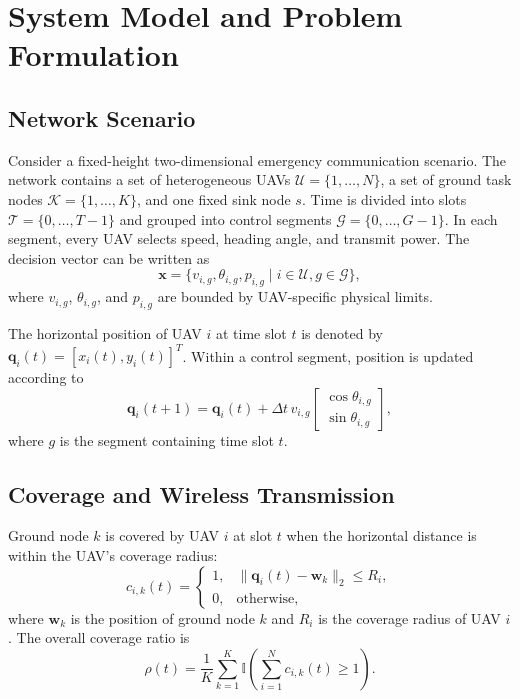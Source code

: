 \documentclass[lettersize,journal]{IEEEtran}
\begin{document}
\section{System Model and Problem Formulation}
\subsection{Network Scenario}
Consider a fixed-height two-dimensional emergency communication scenario. The network contains a set of heterogeneous UAVs $\mathcal{U}=\{1,\ldots,N\}$, a set of ground task nodes $\mathcal{K}=\{1,\ldots,K\}$, and one fixed sink node $s$. Time is divided into slots $\mathcal{T}=\{0,\ldots,T-1\}$ and grouped into control segments $\mathcal{G}=\{0,\ldots,G-1\}$. In each segment, every UAV selects speed, heading angle, and transmit power. The decision vector can be written as
\begin{equation}
\mathbf{x}=\{v_{i,g},\theta_{i,g},p_{i,g}\mid i\in\mathcal{U}, g\in\mathcal{G}\},
\label{eq:decision-vector}
\end{equation}
where $v_{i,g}$, $\theta_{i,g}$, and $p_{i,g}$ are bounded by UAV-specific physical limits.

The horizontal position of UAV $i$ at time slot $t$ is denoted by $\mathbf{q}_i(t)=[x_i(t),y_i(t)]^T$. Within a control segment, position is updated according to
\begin{equation}
\mathbf{q}_i(t+1)=\mathbf{q}_i(t)+\Delta t\,v_{i,g}
\begin{bmatrix}
\cos\theta_{i,g}\\
\sin\theta_{i,g}
\end{bmatrix},
\label{eq:motion}
\end{equation}
where $g$ is the segment containing time slot $t$.

\subsection{Coverage and Wireless Transmission}
Ground node $k$ is covered by UAV $i$ at slot $t$ when the horizontal distance is within the UAV's coverage radius:
\begin{equation}
c_{i,k}(t)=
\begin{cases}
1, & \|\mathbf{q}_i(t)-\mathbf{w}_k\|_2 \le R_i,\\
0, & \text{otherwise},
\end{cases}
\label{eq:coverage}
\end{equation}
where $\mathbf{w}_k$ is the position of ground node $k$ and $R_i$ is the coverage radius of UAV $i$. The overall coverage ratio is
\begin{equation}
\rho(t)=\frac{1}{K}\sum_{k=1}^{K}\mathbb{I}\left(\sum_{i=1}^{N}c_{i,k}(t)\ge 1\right).
\label{eq:coverage-ratio}
\end{equation}
\end{document}
